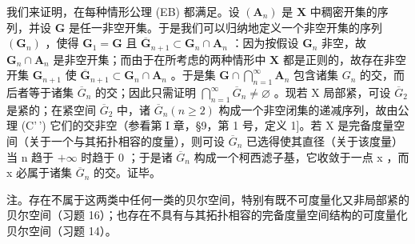 我们来证明，在每种情形公理 (EB) 都满足。设 \((\mathbf{A}_n)\) 是 \(\mathbf{X}\) 中稠密开集的序列，并设 \(\mathbf{G}\) 是任一非空开集。于是我们可以归纳地定义一个非空开集的序列 \((\mathbf{G}_n)\) ，使得 \(\mathbf{G}_1 = \mathbf{G}\) 且 \(\overline{\mathbf{G}}_{n+1} \subset \mathbf{G}_n \cap \mathbf{A}_n\) ：因为按假设 \(\mathbf{G}_n\) 非空，故 \(\mathbf{G}_n \cap \mathbf{A}_n\) 是非空开集；而由于在所考虑的两种情形中 \(\mathbf{X}\) 都是正则的，故存在非空开集 \(\mathbf{G}_{n+1}\) 使 \(\overline{\mathbf{G}}_{n+1} \subset \mathbf{G}_n \cap \mathbf{A}_n\) 。于是集 \(\mathbf{G} \cap \bigcap_{n=1}^{\infty} \mathbf{A}_n\) 包含诸集 \(G_{n}\) 的交，而后者等于诸集 \(\overline{G}_{n}\) 的交；因此只需证明 \(\bigcap_{n=1}^{\infty}\overline{G}_{n}\neq\varnothing\) 。现若 X 局部紧，可设 \(\overline{G}_{2}\) 是紧的；在紧空间 \(\overline{G}_{2}\) 中，诸 \(\overline{G}_{n}(n\geqslant2)\) 构成一个非空闭集的递减序列，故由公理 (C'\,') 它们的交非空（参看第 I 章，§9，第 1 号，定义 1{]}。若 X 是完备度量空间（关于一个与其拓扑相容的度量），则可设 \(\overline{G}_{n}\) 已选得使其直径（关于该度量）当 n 趋于 \(+\infty\) 时趋于 0 ；于是诸 \(\overline{G}_{n}\) 构成一个柯西滤子基，它收敛于一点 x ，而 x 必属于诸集 \(\overline{G}_{n}\) 的交。证毕。

注。存在不属于这两类中任何一类的贝尔空间，特别有既不可度量化又非局部紧的贝尔空间（习题 16）；也存在不具有与其拓扑相容的完备度量空间结构的可度量化贝尔空间（习题 14）。

